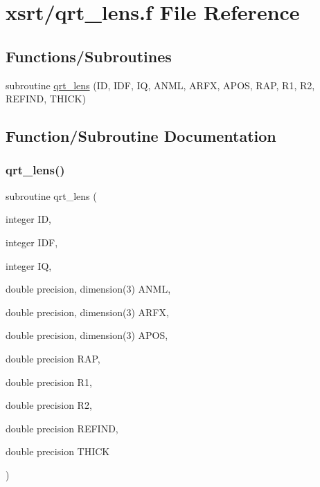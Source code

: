 \hypertarget{qrt__lens_8f}{}\section{xsrt/qrt\+\_\+lens.f File Reference}
\label{qrt__lens_8f}
\subsection*{Functions/\+Subroutines}
\begin{DoxyCompactItemize}
\item 
subroutine \hyperlink{qrt__lens_8f_a7742dd18616abc642a49c3eac7ff7485}{qrt\+\_\+lens} (ID, I\+DF, IQ, A\+N\+ML, A\+R\+FX, A\+P\+OS, R\+AP, R1, R2, R\+E\+F\+I\+ND, T\+H\+I\+CK)
\end{DoxyCompactItemize}


\subsection{Function/\+Subroutine Documentation}
\mbox{\label{qrt__lens_8f_a7742dd18616abc642a49c3eac7ff7485}} 
\subsubsection{\texorpdfstring{qrt\+\_\+lens()}{qrt\_lens()}}
{\footnotesize\ttfamily subroutine qrt\+\_\+lens (\begin{DoxyParamCaption}\item[{integer}]{ID,  }\item[{integer}]{I\+DF,  }\item[{integer}]{IQ,  }\item[{double precision, dimension(3)}]{A\+N\+ML,  }\item[{double precision, dimension(3)}]{A\+R\+FX,  }\item[{double precision, dimension(3)}]{A\+P\+OS,  }\item[{double precision}]{R\+AP,  }\item[{double precision}]{R1,  }\item[{double precision}]{R2,  }\item[{double precision}]{R\+E\+F\+I\+ND,  }\item[{double precision}]{T\+H\+I\+CK }\end{DoxyParamCaption})}


